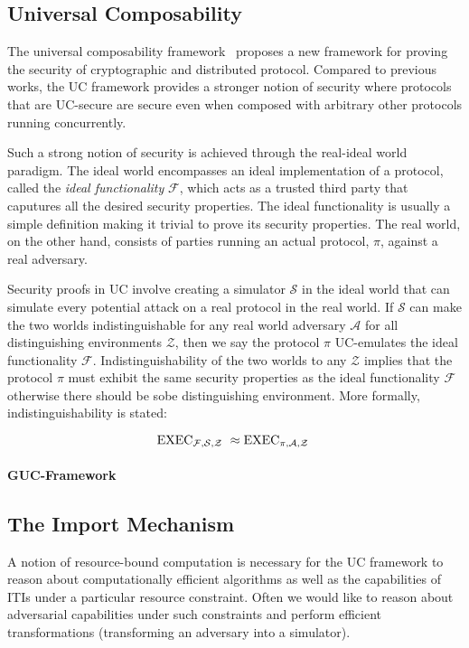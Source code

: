 \subsection{Universal Composability}
The universal composability framework~\cite{uc} proposes a new framework for proving the security of cryptographic and distributed protocol.
Compared to previous works, the UC framework provides a stronger notion of security where protocols that are UC-secure are secure even when composed with arbitrary other protocols running concurrently. 

Such a strong notion of security is achieved through the real-ideal world paradigm.
The ideal world encompasses an ideal implementation of a protocol, called the \textit{ideal functionality} $\mathcal{F}$, which acts as a trusted third party that caputures all the desired security properties.
The ideal functionality is usually a simple definition making it trivial to prove its security properties.
The real world, on the other hand, consists of parties running an actual protocol, $\pi$, against a real adversary.

Security proofs in UC involve creating a simulator $\mathcal{S}$ in the ideal world that can simulate every potential attack on a real protocol in the real world.
If $\mathcal{S}$ can make the two worlds indistinguishable for any real world adversary $\mathcal{A}$ for all distinguishing environments $\mathcal{Z}$, then we say the protocol $\pi$ UC-emulates the ideal functionality $\mathcal{F}$.
Indistinguishability of the two worlds to any $\mathcal{Z}$ implies that the protocol $\pi$ must exhibit the same security properties as the ideal functionality $\mathcal{F}$ otherwise there should be sobe distinguishing environment. 
More formally, indistinguishability is stated:

$$ \text{EXEC}_{\mathcal{F},\mathcal{S},\mathcal{Z}~} \approx \text{EXEC}_{\pi,\mathcal{A},\mathcal{Z}~} $$

\paragraph{GUC-Framework}


\subsection{The Import Mechanism}
A notion of resource-bound computation is necessary for the UC framework to reason about computationally efficient algorithms as well as the capabilities of ITIs under a particular resource constraint.
Often we would like to reason about adversarial capabilities under such constraints and perform efficient transformations (transforming an adversary into a simulator).

